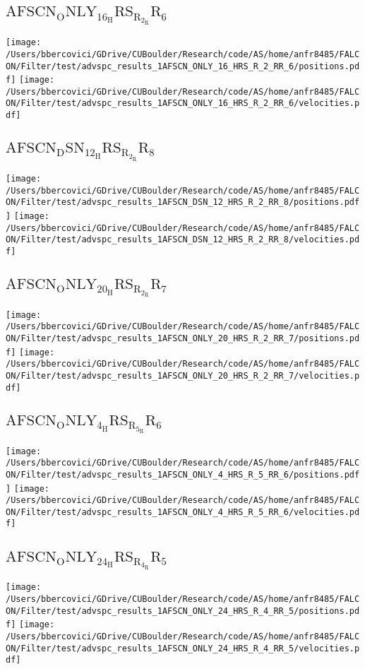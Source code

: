 \subsection{$\mathrm{AFSCN_ONLY_16_HRS_R_2_RR_6}$}
\texttt{[image: /Users/bbercovici/GDrive/CUBoulder/Research/code/AS/home/anfr8485/FALCON/Filter/test/advspc\_results\_1AFSCN\_ONLY\_16\_HRS\_R\_2\_RR\_6/positions.pdf]}
\texttt{[image: /Users/bbercovici/GDrive/CUBoulder/Research/code/AS/home/anfr8485/FALCON/Filter/test/advspc\_results\_1AFSCN\_ONLY\_16\_HRS\_R\_2\_RR\_6/velocities.pdf]}
\subsection{$\mathrm{AFSCN_DSN_12_HRS_R_2_RR_8}$}
\texttt{[image: /Users/bbercovici/GDrive/CUBoulder/Research/code/AS/home/anfr8485/FALCON/Filter/test/advspc\_results\_1AFSCN\_DSN\_12\_HRS\_R\_2\_RR\_8/positions.pdf]}
\texttt{[image: /Users/bbercovici/GDrive/CUBoulder/Research/code/AS/home/anfr8485/FALCON/Filter/test/advspc\_results\_1AFSCN\_DSN\_12\_HRS\_R\_2\_RR\_8/velocities.pdf]}
\subsection{$\mathrm{AFSCN_ONLY_20_HRS_R_2_RR_7}$}
\texttt{[image: /Users/bbercovici/GDrive/CUBoulder/Research/code/AS/home/anfr8485/FALCON/Filter/test/advspc\_results\_1AFSCN\_ONLY\_20\_HRS\_R\_2\_RR\_7/positions.pdf]}
\texttt{[image: /Users/bbercovici/GDrive/CUBoulder/Research/code/AS/home/anfr8485/FALCON/Filter/test/advspc\_results\_1AFSCN\_ONLY\_20\_HRS\_R\_2\_RR\_7/velocities.pdf]}
\subsection{$\mathrm{AFSCN_ONLY_4_HRS_R_5_RR_6}$}
\texttt{[image: /Users/bbercovici/GDrive/CUBoulder/Research/code/AS/home/anfr8485/FALCON/Filter/test/advspc\_results\_1AFSCN\_ONLY\_4\_HRS\_R\_5\_RR\_6/positions.pdf]}
\texttt{[image: /Users/bbercovici/GDrive/CUBoulder/Research/code/AS/home/anfr8485/FALCON/Filter/test/advspc\_results\_1AFSCN\_ONLY\_4\_HRS\_R\_5\_RR\_6/velocities.pdf]}
\subsection{$\mathrm{AFSCN_ONLY_24_HRS_R_4_RR_5}$}
\texttt{[image: /Users/bbercovici/GDrive/CUBoulder/Research/code/AS/home/anfr8485/FALCON/Filter/test/advspc\_results\_1AFSCN\_ONLY\_24\_HRS\_R\_4\_RR\_5/positions.pdf]}
\texttt{[image: /Users/bbercovici/GDrive/CUBoulder/Research/code/AS/home/anfr8485/FALCON/Filter/test/advspc\_results\_1AFSCN\_ONLY\_24\_HRS\_R\_4\_RR\_5/velocities.pdf]}
